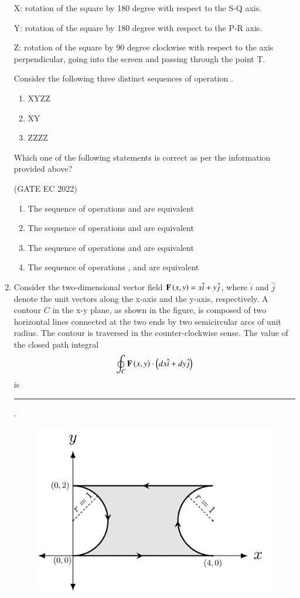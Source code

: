 \documentclass[journal,12pt,onecolumn]{IEEEtran}
\theoremstyle{remark}
\begin{document}
\begin{enumerate}
    X: rotation of the square by 180 degree with respect to the S-Q axis.
    
    Y: rotation of the square by 180 degree with respect to the P-R axis.
    
    Z: rotation of the square by 90 degree clockwise with respect to the axis perpendicular, going into the screen and passing through the point T.
    
    Consider the following three distinct sequences of operation .
    \begin{enumerate}
        \item XYZZ
        \item XY
        \item ZZZZ
    \end{enumerate}
    Which one of the following statements is correct as per the information provided above?

    \hfill{(GATE EC 2022)}
    \begin{enumerate}
        \item The sequence of operations  and  are equivalent
        \item The sequence of operations  and  are equivalent
        \item The sequence of operations  and  are equivalent
        \item The sequence of operations ,  and  are equivalent
    \end{enumerate}

    \item Consider the two-dimensional vector field $\mathbf{F}\left(x, y\right) = x\hat{i} + y\hat{j}$, where $\hat{i}$ and $\hat{j}$ denote the unit vectors along the x-axis and the y-axis, respectively. A contour $C$ in the x-y plane, as shown in the figure, is composed of two horizontal lines connected at the two ends by two semicircular arcs of unit radius. The contour is traversed in the counter-clockwise sense. The value of the closed path integral
    \begin{align*}
        \oint_C \mathbf{F}\left(x, y\right) \cdot \left(dx\hat{i} + dy\hat{j}\right)
    \end{align*}
    is \rule{2cm}{0.4pt}.
    \begin{figure}[H]
        \centering
        \includegraphics[width=0.5\columnwidth]{figs/m4.jpg}
        \caption*{}
        \label{fig:m4}
    \end{figure}


\end{enumerate}
\end{document}
